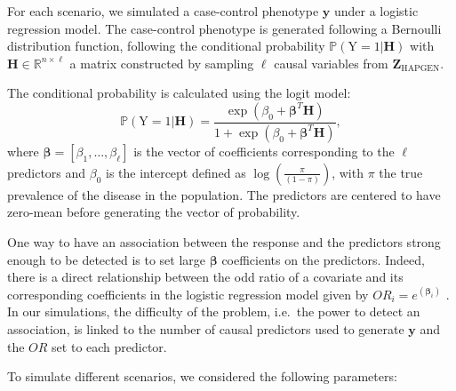 \documentclass[]{book}
\begin{document}
For each scenario, we simulated a case-control phenotype \(\mathbf{y}\) under a
logistic regression model. The case-control phenotype is generated
following a Bernoulli distribution function, following the conditional
probability \(\mathbb{P}(\mathrm{Y}=1|\mathbf{H})\) with
\(\mathbf{H} \in \mathbb{R}^{n \times \ell}\) a matrix constructed by sampling
\(\ell\) causal variables from \(\mathbf{Z}_{\text{HAPGEN}}\).

The conditional probability is calculated using the logit model:
\[\mathbb{P}(\mathrm{Y}=1|\mathbf{H}) = \frac{\exp(\beta_0 +
    \boldsymbol{\beta}^T \mathbf{H})} {1 + \exp(\beta_0 +
    \boldsymbol{\beta}^T \mathbf{H})},\]
where \(\boldsymbol{\beta} = [\beta_1, \dots, \beta_\ell]\) is
the vector of coefficients corresponding to the \(\ell\) predictors and
\(\beta_0\) is the intercept defined as
\({ \log \left(\frac{\pi}{(1-\pi)}\right)}\), with \(\pi\) the true
prevalence of the disease in the population. The predictors are centered
to have zero-mean before generating the vector of probability.

One way to have an association between the response and the predictors
strong enough to be detected is to set large \(\boldsymbol{\beta}\) coefficients on
the predictors. Indeed, there is a direct relationship between the odd
ratio of a covariate and its corresponding coefficients in the logistic
regression model given by \(OR_i = e^{(\boldsymbol\beta_i)}\)
\citep{Diaz_simple_2012}. In our simulations, the difficulty of the problem,
i.e.~the power to detect an association, is linked to the number of
causal predictors used to generate \(\mathbf{y}\) and the \(OR\) set to each
predictor.

To simulate different scenarios, we considered the following parameters:
\end{document}
